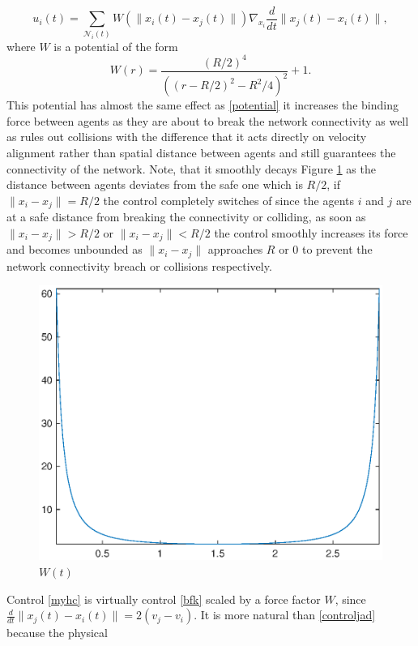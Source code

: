 \documentclass[a4paper, english]{article}
\begin{document}
\begin{equation}\label{myhc}
u_i(t) = \sum_{\mathcal{N}_{i}(t)}W(\|x_i(t) - x_j(t)\|) \nabla_{x_i} \frac{d}{dt}\|x_j(t) - x_i(t)\|,
\end{equation}
where $W$ is a potential of the form
\begin{equation}
 W(r) = \frac{(R/2)^4}{((r - R/2)^2  - R^2/4)^2} + 1.
\label{potentialw}
\end{equation}
This potential has almost the same effect as \eqref{potential} it increases the binding force between agents as they are about to break the network connectivity as well as rules out collisions with the difference that it acts directly on velocity alignment rather than spatial distance between agents and still guarantees the connectivity of the network. Note, that it smoothly decays Figure \ref{potentialwplot} as the distance between agents deviates from the safe one which is $R/2$, if $\|x_i - x_j\| = R/2$ the control completely switches of since the agents $i$ and $j$ are at a safe distance from breaking the connectivity or colliding,
as soon as  $\|x_i - x_j\| > R/2$ or $\|x_i - x_j\| < R/2$ the control smoothly increases its force and becomes unbounded as $\|x_i - x_j\|$ approaches $R$ or $0$ to prevent the network connectivity breach or collisions respectively.
\begin{figure}[ht]
 \centering
 \includegraphics[scale=0.5]{figures/potentialwplot.eps}
 \caption{$W(t)$}
 \label{potentialwplot}
\end{figure}
Control \eqref{myhc} is virtually control \eqref{bfk}  scaled by a force factor $W$, since $\frac{d}{dt}\|x_j(t) - x_i(t)\| = 2(v_j - v_i)$. It is more natural than \eqref{controljad} because the physical
\end{document}
